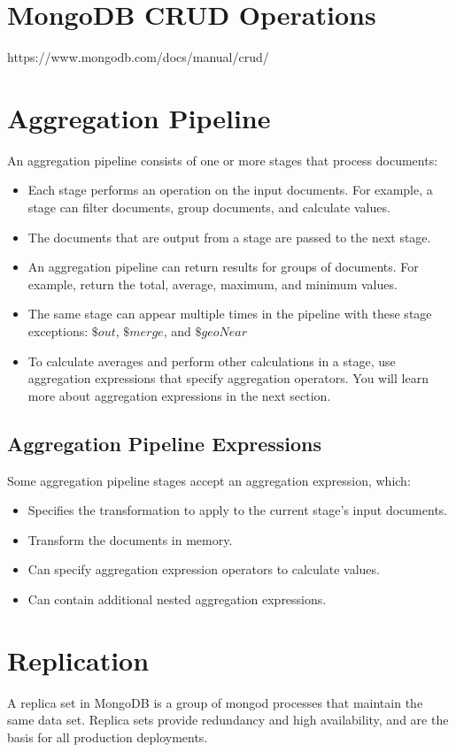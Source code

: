 \section{MongoDB CRUD Operations}
https://www.mongodb.com/docs/manual/crud/

\section{Aggregation Pipeline}
An aggregation pipeline consists of one or more stages that process documents:
\begin{itemize}
    \item Each stage performs an operation on the input documents. For example, a stage can filter documents, group documents, and calculate values.
    \item The documents that are output from a stage are passed to the next stage.
    \item An aggregation pipeline can return results for groups of documents. For example, return the total, average, maximum, and minimum values.
    \item The same stage can appear multiple times in the pipeline with these stage exceptions: \(\$out\), \(\$merge\), and \(\$geoNear\)
    \item To calculate averages and perform other calculations in a stage, use aggregation expressions that specify aggregation operators. You will learn more about aggregation expressions in the next section.
\end{itemize}

\subsection{Aggregation Pipeline Expressions}
Some aggregation pipeline stages accept an aggregation expression, which:
\begin{itemize}
    \item Specifies the transformation to apply to the current stage's input documents.
    \item Transform the documents in memory.
    \item Can specify aggregation expression operators to calculate values.
    \item Can contain additional nested aggregation expressions.
\end{itemize}

\section{Replication}
A replica set in MongoDB is a group of mongod processes that maintain the same data set. Replica sets provide redundancy and high availability, and are the basis for all production deployments.

